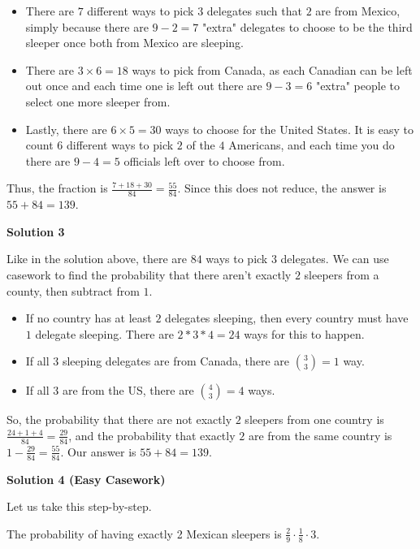 \begin{enumerate}
 
            \begin{itemize}
        \item There are $7$ different ways to pick $3$ delegates such that $2$ are from Mexico, simply because there are $9-2=7$ "extra" delegates to choose to be the third sleeper once both from Mexico are sleeping.
        \item There are $3\times6=18$ ways to pick from Canada, as each Canadian can be left out once and each time one is left out there are $9-3=6$ "extra" people to select one more sleeper from.
        \item Lastly, there are $6\times5=30$ ways to choose for the United States. It is easy to count $6$ different ways to pick $2$ of the $4$ Americans, and each time you do there are $9-4=5$ officials left over to choose from.
            \end{itemize}
            Thus, the fraction is $\frac{7+18+30}{84} = \frac{55}{84}$. Since this does not reduce, the answer is $55+84=\boxed{139}$.

 



\textbf{Solution 3}

Like in the solution above, there are $84$ ways to pick  $3$ delegates. We can use casework to find the probability that there aren't exactly $2$ sleepers from a county, then subtract from $1$.

 
            \begin{itemize}
        \item If no country has at least $2$ delegates sleeping, then every country must have $1$ delegate sleeping. There are $2*3*4=24$ ways for this to happen.
        \item If all $3$ sleeping delegates are from Canada, there are $\binom{3}{3} = 1$ way.
        \item If all $3$ are from the US, there are $\binom{4}{3} = 4$ ways.
            \end{itemize}
            So, the probability that there are not exactly $2$ sleepers from one country is $\frac{24+1+4}{84} = \frac{29}{84}$, and the probability that exactly $2$ are from the same country is $1- \frac{29}{84} = \frac{55}{84}.$ Our answer is $55+84=\boxed{139}$.

 



\textbf{Solution 4 (Easy Casework)}

Let us take this step-by-step.

 The probability of having exactly 2 Mexican sleepers is $\frac{2}{9} \cdot \frac{1}{8} \cdot 3$.


\end{enumerate}
